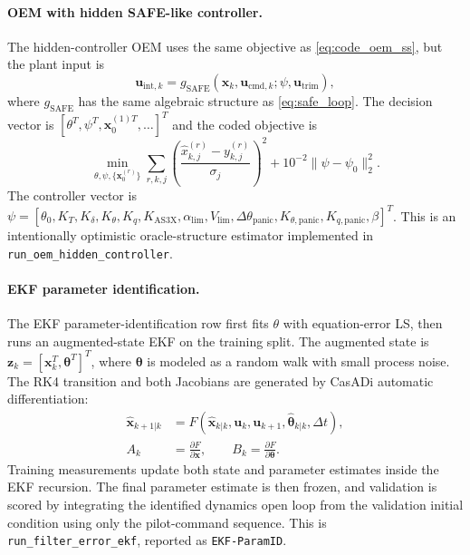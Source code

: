 \documentclass[11pt]{article}
\begin{document}
\paragraph{OEM with hidden SAFE-like controller.}
The hidden-controller OEM uses the same objective as
\eqref{eq:code_oem_ss}, but the plant input is
\[
    \mathbf{u}_{\mathrm{int},k}
    =
    g_{\mathrm{SAFE}}(\mathbf{x}_k,\mathbf{u}_{\mathrm{cmd},k};
    \psi,\mathbf{u}_{\mathrm{trim}}),
\]
where $g_{\mathrm{SAFE}}$ has the same algebraic structure as
\eqref{eq:safe_loop}. The decision vector is
$[\theta^T,\psi^T,\mathbf{x}_{0}^{(1)T},\ldots]^T$ and the coded objective is
\begin{equation}
    \min_{\theta,\psi,\{\mathbf{x}_0^{(r)}\}}
    \sum_{r,k,j}
    \left(\frac{\hat{x}_{k,j}^{(r)}-y_{k,j}^{(r)}}{\sigma_j}\right)^2
    +10^{-2}\|\psi-\psi_0\|_2^2.
    \label{eq:code_oem_hidden}
\end{equation}
The controller vector is
$\psi=[\theta_0,K_T,K_\delta,K_\theta,K_q,K_{\mathrm{AS3X}},
\alpha_{\lim},V_{\lim},\Delta\theta_{\mathrm{panic}},
K_{\theta,\mathrm{panic}},K_{q,\mathrm{panic}},\beta]^T$.
This is an intentionally optimistic oracle-structure estimator implemented in
\texttt{run\_oem\_hidden\_controller}.

\paragraph{EKF parameter identification.}
The EKF parameter-identification row first fits $\theta$ with equation-error
LS, then runs an augmented-state EKF on the training split. The augmented state
is $\mathbf{z}_k=[\mathbf{x}_k^T,\boldsymbol{\theta}^T]^T$, where
$\boldsymbol{\theta}$ is modeled as a random walk with small process noise. The
RK4 transition and both Jacobians are generated by CasADi automatic
differentiation:
\begin{align}
    \hat{\mathbf{x}}_{k+1|k}
        &=F(\hat{\mathbf{x}}_{k|k},\mathbf{u}_k,\mathbf{u}_{k+1},
            \hat{\boldsymbol{\theta}}_{k|k},\Delta t),\\
    A_k &= \frac{\partial F}{\partial \mathbf{x}},
    \qquad
    B_k = \frac{\partial F}{\partial \boldsymbol{\theta}}.
    \label{eq:code_ekf}
\end{align}
Training measurements update both state and parameter estimates inside the EKF
recursion. The final parameter estimate is then frozen, and validation is scored
by integrating the identified dynamics open loop from the validation initial
condition using only the pilot-command sequence. This is
\texttt{run\_filter\_error\_ekf}, reported as \texttt{EKF-ParamID}.
\end{document}
